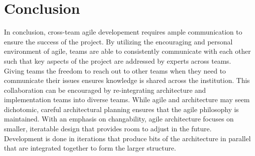 \section{Conclusion}
In conclusion, cross-team agile developement requires ample communication to ensure the success of the project.
By utilizing the encouraging and personal environment of agile, teams are able to consistently communicate with each other such that key aspects of the project are addressed by experts across teams.
Giving teams the freedom to reach out to other teams when they need to communicate their issues ensures knowledge is shared across the institution.
This collaboration can be encouraged by re-integrating architecture and implementation teams into diverse teams.
While agile and architecture may seem dichotomic, careful architectural planning ensures that the agile philosophy is maintained.
With an emphasis on changability, agile architecture focuses on smaller, iteratable design that provides room to adjust in the future.
Development is done in iterations that produce bits of the architecture in parallel that are integrated together to form the larger structure.
